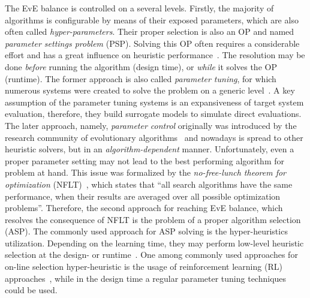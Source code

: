 The EvE balance is controlled on a several levels. Firstly, the majority of algorithms is configurable by means of their exposed parameters, which are also often called \emph{hyper-parameters}. Their proper selection is also an OP and named \emph{parameter settings problem} (PSP). Solving this OP often requires a considerable effort and has a great influence on heuristic performance~\cite{lavesson2006quantifying}. The resolution may be done \emph{before} running the algorithm (design time), or \emph{while} it solves the OP (runtime). The former approach is also called \emph{parameter tuning}, for which numerous systems were created to solve the problem on a generic level~\cite{hutter2009paramils,hutter2011sequential,lopez2016irace,falkner2018bohb,brise2spl}. A key assumption of the parameter tuning systems is an expansiveness of target system evaluation, therefore, they build surrogate models to simulate direct evaluations. The later approach, namely, \emph{parameter control} originally was introduced by the research community of evolutionary algorithms~\cite{karafotias2014parameter} and nowadays is spread to other heuristic solvers, but in an \emph{algorithm-dependent} manner. Unfortunately, even a proper parameter setting may not lead to the best performing algorithm for problem at hand. This issue was formalized by the \emph{no-free-lunch theorem for optimization} (NFLT)~\cite{wolpert1997no}, which states that ``all search algorithms have the same performance, when their results are averaged over all possible optimization problems''. Therefore, the second approach for reaching EvE balance, which resolves the consequence of NFLT is the problem of a proper algorithm selection (ASP). The commonly used approach for ASP solving is the hyper-heuristics utilization. Depending on the learning time, they may perform low-level heuristic selection at the design- or runtime~\cite{burke2019classification}. One among commonly used approaches for on-line selection hyper-heuristic is the usage of reinforcement learning (RL) approaches~\cite{moriarty1999evolutionary,mcclymont2011markov}, while in the design time a regular parameter tuning techniques could be used.

